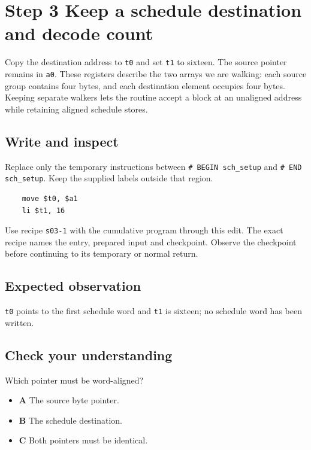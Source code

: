 \section{Step 3 Keep a schedule destination and decode count}\label{sha-s03}

Copy the destination address to \texttt{t0} and set \texttt{t1} to sixteen. The source pointer remains in \texttt{a0}. These registers describe the two arrays we are walking: each source group contains four bytes, and each destination element occupies four bytes. Keeping separate walkers lets the routine accept a block at an unaligned address while retaining aligned schedule stores.

\subsection{Write and inspect}
Replace only the temporary instructions between \texttt{\# BEGIN sch\_setup} and \texttt{\# END sch\_setup}. Keep the supplied labels outside that region.

\begin{verbatim}
    move $t0, $a1
    li $t1, 16
\end{verbatim}

Use recipe \texttt{s03-1} with the cumulative program through this edit. The exact recipe names the entry, prepared input and checkpoint. Observe the checkpoint before continuing to its temporary or normal return.

\subsection{Expected observation}
\texttt{t0} points to the first schedule word and \texttt{t1} is sixteen; no schedule word has been written.

\subsection{Check your understanding}
Which pointer must be word-aligned?

\begin{itemize}
  \item \textbf{A} The source byte pointer.
  \item \textbf{B} The schedule destination.
  \item \textbf{C} Both pointers must be identical.
\end{itemize}
